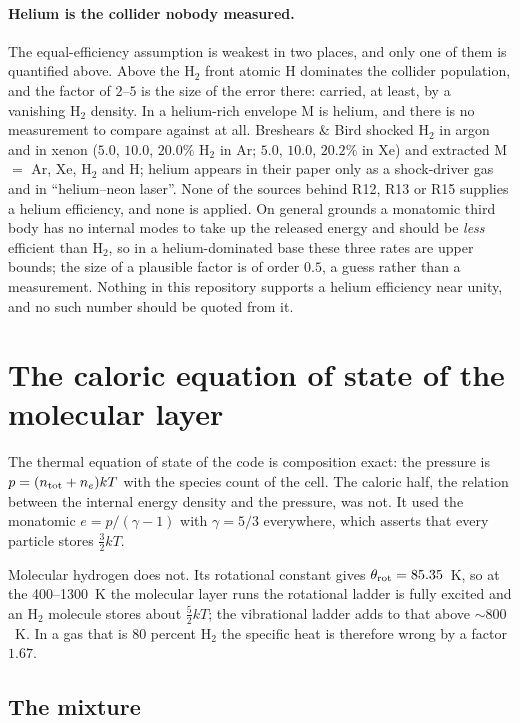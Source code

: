 \documentclass[english,a4paper]{my_memo}
\begin{document}
\paragraph{Helium is the collider nobody measured.} The equal-efficiency
assumption is weakest in two places, and only one of them is quantified above.
Above the H$_2$ front atomic H dominates the collider population, and the
factor of $2$--$5$ is the size of the error there: carried, at least, by a
vanishing H$_2$ density. In a helium-rich envelope M is helium, and there is
no measurement to compare against at all. Breshears \& Bird shocked H$_2$ in
argon and in xenon ($5.0$, $10.0$, $20.0\%$ H$_2$ in Ar; $5.0$, $10.0$,
$20.2\%$ in Xe) and extracted M $=$ Ar, Xe, H$_2$ and H; helium appears in
their paper only as a shock-driver gas and in ``helium--neon laser''. None of
the sources behind R12, R13 or R15 supplies a helium efficiency, and none is
applied. On general grounds a monatomic third body has no internal modes to
take up the released energy and should be \emph{less} efficient than H$_2$, so
in a helium-dominated base these three rates are upper bounds; the size of
a plausible factor is of order $0.5$, a guess rather than a
measurement. Nothing in this repository supports a helium efficiency near
unity, and no such number should be quoted from it.

\section{The caloric equation of state of the molecular layer}
\label{sec:caloric_eos}

The thermal equation of state of the code is composition exact: the pressure
is $p = (n_{\rm tot} + n_e) k T$ with the species count of the cell. The
caloric half, the relation between the internal energy density and the
pressure, was not. It used the monatomic
$e = p/(\gamma-1)$ with $\gamma = 5/3$ everywhere, which asserts that every
particle stores $\tfrac{3}{2} k T$.

Molecular hydrogen does not. Its rotational constant gives
$\theta_{\rm rot} = 85.35$~K, so at the 400--1300~K the molecular layer runs
the rotational ladder is fully excited and an H$_2$ molecule stores about
$\tfrac{5}{2} k T$; the vibrational ladder adds to that above $\sim 800$~K.
In a gas that is 80 percent H$_2$ the specific heat is therefore wrong by a
factor $1.67$.

\subsection{The mixture}
\end{document}
